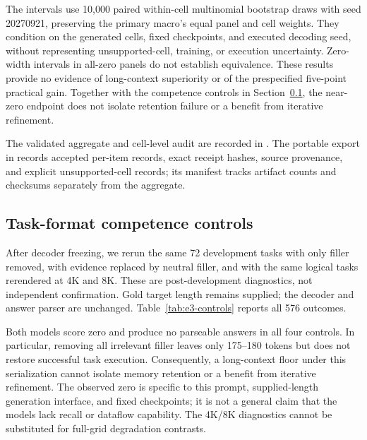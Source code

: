 The intervals use 10,000 paired within-cell multinomial bootstrap draws with seed 20270921, preserving the primary macro's equal panel and cell weights. They condition on the generated cells, fixed checkpoints, and executed decoding seed, without representing unsupported-cell, training, or execution uncertainty. Zero-width intervals in all-zero panels do not establish equivalence. These results provide no evidence of long-context superiority or of the prespecified five-point practical gain. Together with the competence controls in Section~\ref{m:competence}, the near-zero endpoint does not isolate retention failure or a benefit from iterative refinement.

The validated aggregate and cell-level audit are recorded in . The portable export in  records accepted per-item records, exact receipt hashes, source provenance, and explicit unsupported-cell records; its manifest tracks artifact counts and checksums separately from the aggregate.





\subsection{Task-format competence controls}
\label{m:competence}
After decoder freezing, we rerun the same 72 development tasks with only filler removed, with evidence replaced by neutral filler, and with the same logical tasks rerendered at 4K and 8K. These are post-development diagnostics, not independent confirmation. Gold target length remains supplied; the decoder and answer parser are unchanged. Table~\ref{tab:e3-controls} reports all 576 outcomes.

Both models score zero and produce no parseable answers in all four controls. In particular, removing all irrelevant filler leaves only 175--180 tokens but does not restore successful task execution. Consequently, a long-context floor under this serialization cannot isolate memory retention or a benefit from iterative refinement. The observed zero is specific to this prompt, supplied-length generation interface, and fixed checkpoints; it is not a general claim that the models lack recall or dataflow capability. The 4K/8K diagnostics cannot be substituted for full-grid degradation contrasts.




